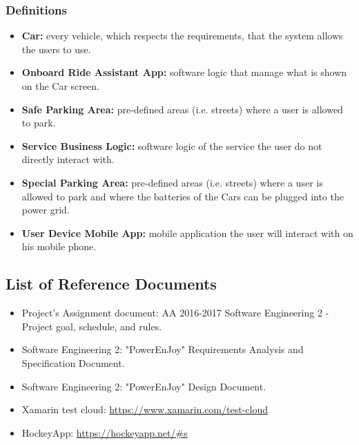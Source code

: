 \subsubsection{Definitions}
\begin{itemize}
    \item \textbf{Car:} every vehicle, which respects the requirements, that the system allows the users to use.
    \item \textbf{Onboard Ride Assistant App:} software logic that manage what is shown on the Car screen.
    \item \textbf{Safe Parking Area:} pre-defined areas (i.e. streets) where a user is allowed to park.
    \item \textbf{Service Business Logic:} software logic of the service the user do not directly interact with.
    \item \textbf{Special Parking Area:} pre-defined areas (i.e. streets) where a user is allowed to park and where the batteries of the Cars can be plugged into the power grid.
    \item \textbf{User Device Mobile App:} mobile application the user will interact with on his mobile phone.
\end{itemize}


\subsection{List of Reference Documents}
\begin{itemize}
    \item Project’s Assignment document: AA 2016-2017 Software Engineering 2 - Project goal, schedule, and rules.
    \item Software Engineering 2: "PowerEnJoy" Requirements Analysis and Specification Document.
    \item Software Engineering 2: "PowerEnJoy" Design Document.
    \item Xamarin test cloud: \url{https://www.xamarin.com/test-cloud}
    \item HockeyApp: \url{https://hockeyapp.net/#s}
\end{itemize}